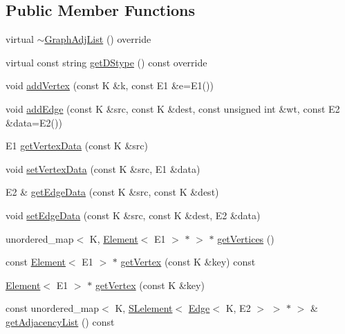 \subsection*{Public Member Functions}
\begin{DoxyCompactItemize}
\item 
virtual \hyperlink{classbridges_1_1_graph_adj_list_af7acceab0f85c75de56cf2fc74b3690b}{$\sim$\+Graph\+Adj\+List} () override
\item 
virtual const string \hyperlink{classbridges_1_1_graph_adj_list_a4ff076ac9d2a8c5c8f6444160f1f62ff}{get\+D\+Stype} () const  override
\item 
void \hyperlink{classbridges_1_1_graph_adj_list_a55565a4aff573c6a7751d7845cdfd5f2}{add\+Vertex} (const K \&k, const E1 \&e=E1())
\item 
void \hyperlink{classbridges_1_1_graph_adj_list_acd9a3bf8e544a6b78e75acd6bf1d57ee}{add\+Edge} (const K \&src, const K \&dest, const unsigned int \&wt, const E2 \&data=E2())
\item 
E1 \hyperlink{classbridges_1_1_graph_adj_list_a2b419a910171cafac2b71ba9f8692e5e}{get\+Vertex\+Data} (const K \&src)
\item 
void \hyperlink{classbridges_1_1_graph_adj_list_aa30a944a429e0422cbe0ddd7bdbd353b}{set\+Vertex\+Data} (const K \&src, E1 \&data)
\item 
E2 \& \hyperlink{classbridges_1_1_graph_adj_list_a3e4b21d0ff4b277502b2bb10e57df3c7}{get\+Edge\+Data} (const K \&src, const K \&dest)
\item 
void \hyperlink{classbridges_1_1_graph_adj_list_ac507940618b400d792c29b69fc9c7687}{set\+Edge\+Data} (const K \&src, const K \&dest, E2 \&data)
\item 
unordered\+\_\+map$<$ K, \hyperlink{classbridges_1_1_element}{Element}$<$ E1 $>$ $\ast$ $>$ $\ast$ \hyperlink{classbridges_1_1_graph_adj_list_a157c80e2bd439572f4f80e8850700297}{get\+Vertices} ()
\item 
const \hyperlink{classbridges_1_1_element}{Element}$<$ E1 $>$ $\ast$ \hyperlink{classbridges_1_1_graph_adj_list_ad265019b9a81b928b6bf7c6aecff9d1a}{get\+Vertex} (const K \&key) const 
\item 
\hyperlink{classbridges_1_1_element}{Element}$<$ E1 $>$ $\ast$ \hyperlink{classbridges_1_1_graph_adj_list_a8ba3aefe8e118ce8d8d6fab807e494c1}{get\+Vertex} (const K \&key)
\item 
const unordered\+\_\+map$<$ K, \hyperlink{classbridges_1_1_s_lelement}{S\+Lelement}$<$ \hyperlink{classbridges_1_1_edge}{Edge}$<$ K, E2 $>$ $>$ $\ast$ $>$ \& \hyperlink{classbridges_1_1_graph_adj_list_a76cd71b3ae3244115a6b73a2f4e6d4a1}{get\+Adjacency\+List} () const 

\end{DoxyCompactItemize}
